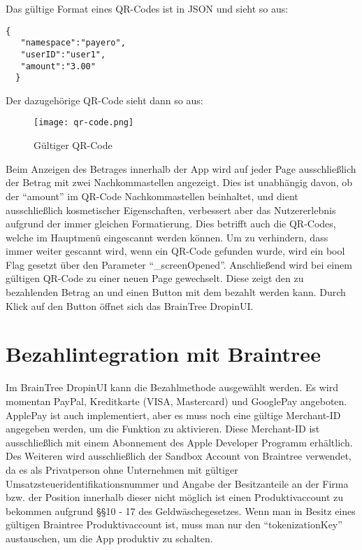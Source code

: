 Das gültige Format eines QR-Codes ist in JSON und sieht so aus:

\begin{lstlisting}[caption={Gültiger QR-Code}]
  {
   "namespace":"payero",
   "userID":"user1",
   "amount":"3.00"
  }
\end{lstlisting}

Der dazugehörige QR-Code sieht dann so aus:

\begin{figure}[H]
  \centering
  \texttt{[image: qr-code.png]}
  \caption{Gültiger QR-Code}
\end{figure}

Beim Anzeigen des Betrages innerhalb der App wird auf jeder Page ausschließlich der Betrag mit zwei Nachkommastellen angezeigt.
Dies ist unabhängig davon, ob der ``amount'' im QR-Code Nachkommastellen beinhaltet, und dient ausschließlich kosmetischer Eigenschaften, verbessert aber das Nutzererlebnis aufgrund der immer gleichen Formatierung.
Dies betrifft auch die QR-Codes, welche im Hauptmenü eingescannt werden können.
Um zu verhindern, dass immer weiter gescannt wird, wenn ein QR-Code gefunden wurde, wird ein bool Flag gesetzt über den Parameter ``\_screenOpened''.
Anschließend wird bei einem gültigen QR-Code zu einer neuen Page gewechselt.
Diese zeigt den zu bezahlenden Betrag an und einen Button mit dem bezahlt werden kann.
Durch Klick auf den Button öffnet sich das BrainTree DropinUI.

\section{Bezahlintegration mit Braintree}

Im BrainTree DropinUI kann die Bezahlmethode ausgewählt werden.
Es wird momentan PayPal, Kreditkarte (VISA, Mastercard) und GooglePay angeboten.
ApplePay ist auch implementiert, aber es muss noch eine gültige Merchant-ID angegeben werden, um die Funktion zu aktivieren.
Diese Merchant-ID ist ausschließlich mit einem Abonnement des Apple Developer Programm erhältlich.
Des Weiteren wird ausschließlich der Sandbox Account von Braintree verwendet, da es als Privatperson ohne Unternehmen mit gültiger Umsatzsteueridentifikationsnummer und Angabe der Besitzanteile an der Firma bzw. der Position innerhalb dieser nicht möglich ist einen Produktivaccount zu bekommen aufgrund \S\S 10 - 17 des Geldwäschegesetzes.
Wenn man in Besitz eines gültigen Braintree Produktivaccount ist, muss man nur den ``tokenizationKey'' austauschen, um die App produktiv zu schalten.

